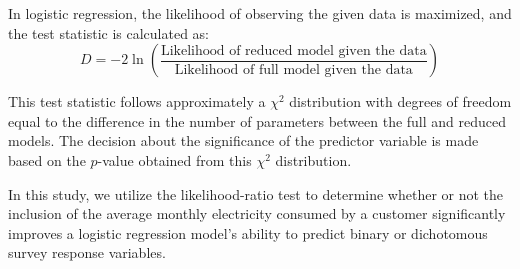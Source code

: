 In logistic regression, the likelihood of observing the given data is maximized, and the test statistic is calculated as:
\begin{equation}
	D = -2 \ln\left(\frac{\text{Likelihood of reduced model given the data}}{\text{Likelihood of full model given the data}}\right)
\end{equation}

This test statistic follows approximately a $\chi^2$ distribution with degrees of freedom equal to the difference in the number of parameters between the full and reduced models. The decision about the significance of the predictor variable is made based on the $p$-value obtained from this $\chi^2$ distribution.

In this study, we utilize the likelihood-ratio test to determine whether or not the inclusion of the average monthly electricity consumed by a customer significantly improves a logistic regression model's ability to predict binary or dichotomous survey response variables.